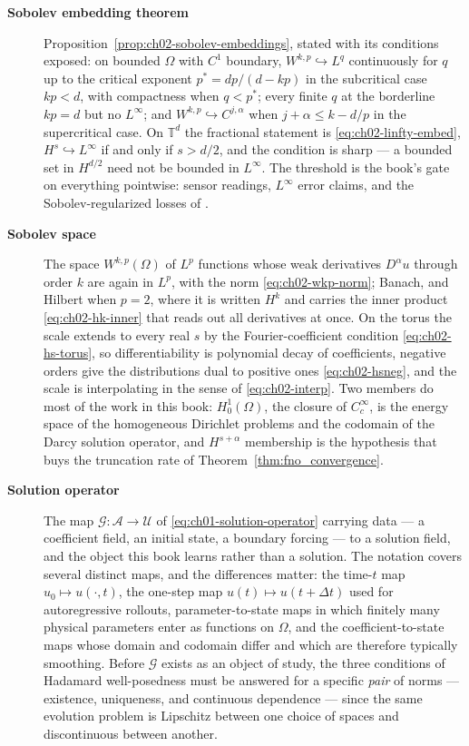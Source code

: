 \begin{description}
\item[\textbf{Sobolev embedding theorem}] Proposition~\ref{prop:ch02-sobolev-embeddings},
stated with its conditions exposed: on bounded $\Omega$ with $C^{1}$ boundary,
$W^{k,p} \hookrightarrow L^{q}$ continuously for $q$ up to the critical exponent
$p^{*} = dp/(d - kp)$ in the subcritical case $kp < d$, with compactness when $q < p^{*}$;
every finite $q$ at the borderline $kp = d$ but no $L^{\infty}$; and
$W^{k,p} \hookrightarrow C^{j,\alpha}$ when $j + \alpha \le k - d/p$ in the supercritical
case. On $\mathbb{T}^{d}$ the fractional statement is \eqref{eq:ch02-linfty-embed},
$H^{s} \hookrightarrow L^{\infty}$ if and only if $s > d/2$, and the condition is sharp ---
a bounded set in $H^{d/2}$ need not be bounded in $L^{\infty}$. The threshold is the book's
gate on everything pointwise: sensor readings, $L^{\infty}$ error claims, and the
Sobolev-regularized losses of .

\item[\textbf{Sobolev space}] The space $W^{k,p}(\Omega)$ of $L^{p}$ functions whose weak
derivatives $D^{\alpha} u$ through order $k$ are again in $L^{p}$, with the norm
\eqref{eq:ch02-wkp-norm}; Banach, and Hilbert when $p = 2$, where it is written $H^{k}$ and
carries the inner product \eqref{eq:ch02-hk-inner} that reads out all derivatives at once.
On the torus the scale extends to every real $s$ by the Fourier-coefficient condition
\eqref{eq:ch02-hs-torus}, so differentiability is polynomial decay of coefficients, negative
orders give the distributions dual to positive ones \eqref{eq:ch02-hsneg}, and the scale is
interpolating in the sense of \eqref{eq:ch02-interp}. Two members do most of the work in
this book: $H^{1}_{0}(\Omega)$, the closure of $C_{c}^{\infty}$, is the energy space of the
homogeneous Dirichlet problems and the codomain of the Darcy solution operator, and
$H^{s+\alpha}$ membership is the hypothesis that buys the truncation rate of
Theorem~\ref{thm:fno_convergence}. 

\item[\textbf{Solution operator}] The map $\mathcal{G} : \mathcal{A} \to \mathcal{U}$ of
\eqref{eq:ch01-solution-operator} carrying data --- a coefficient field, an initial state,
a boundary forcing --- to a solution field, and the object this book learns rather than a
solution. The notation covers several distinct maps, and the differences matter: the
time-$t$ map $u_{0} \mapsto u(\cdot, t)$, the one-step map $u(t) \mapsto u(t + \Delta t)$
used for autoregressive rollouts, parameter-to-state maps in which finitely many physical
parameters enter as functions on $\Omega$, and the coefficient-to-state maps whose domain
and codomain differ and which are therefore typically smoothing. Before $\mathcal{G}$ exists
as an object of study, the three conditions of Hadamard well-posedness must be answered for
a specific \emph{pair} of norms --- existence, uniqueness, and continuous dependence ---
since the same evolution problem is Lipschitz between one choice of spaces and
discontinuous between another. 


\end{description}
